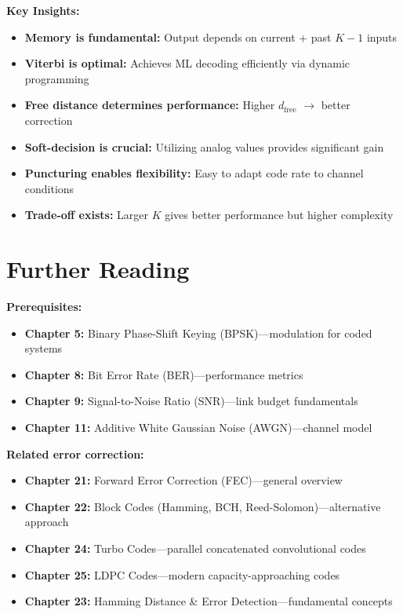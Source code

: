 \textbf{Key Insights:}
\begin{itemize}
\item \textbf{Memory is fundamental:} Output depends on current + past $K-1$ inputs
\item \textbf{Viterbi is optimal:} Achieves ML decoding efficiently via dynamic programming
\item \textbf{Free distance determines performance:} Higher $d_{\text{free}}$ $\rightarrow$ better correction
\item \textbf{Soft-decision is crucial:} Utilizing analog values provides significant gain
\item \textbf{Puncturing enables flexibility:} Easy to adapt code rate to channel conditions
\item \textbf{Trade-off exists:} Larger $K$ gives better performance but higher complexity
\end{itemize}

\section{Further Reading}

\textbf{Prerequisites:}
\begin{itemize}
\item \textbf{Chapter 5:} Binary Phase-Shift Keying (BPSK)---modulation for coded systems
\item \textbf{Chapter 8:} Bit Error Rate (BER)---performance metrics
\item \textbf{Chapter 9:} Signal-to-Noise Ratio (SNR)---link budget fundamentals
\item \textbf{Chapter 11:} Additive White Gaussian Noise (AWGN)---channel model
\end{itemize}

\textbf{Related error correction:}
\begin{itemize}
\item \textbf{Chapter 21:} Forward Error Correction (FEC)---general overview
\item \textbf{Chapter 22:} Block Codes (Hamming, BCH, Reed-Solomon)---alternative approach
\item \textbf{Chapter 24:} Turbo Codes---parallel concatenated convolutional codes
\item \textbf{Chapter 25:} LDPC Codes---modern capacity-approaching codes
\item \textbf{Chapter 23:} Hamming Distance \& Error Detection---fundamental concepts
\end{itemize}

